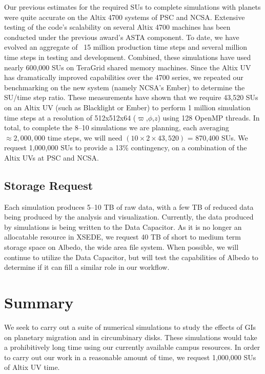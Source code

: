 \documentclass[12pt,preprint2]{aastex}
\begin{document}
Our previous estimates for the required SUs to complete simulations with planets were quite accurate on the Altix 4700
systems of PSC and NCSA. Extensive testing of the
code's scalability on several Altix 4700 machines has been conducted under the previous award's ASTA component. To date, we
have evolved an aggregate of ~15 million production time steps and several million time steps in testing and
development. Combined, these simulations have used nearly 600,000 SUs on TeraGrid shared memory machines. Since the
Altix UV has dramatically improved capabilities over the 4700 series, we repeated our benchmarking on the new system
(namely NCSA's Ember) to determine the SU/time step ratio.  These  measurements have shown that we require
43,520 SUs on an Altix UV (such as Blacklight or Ember) to perform 1 million simulation time steps at a
resolution of 512x512x64 ($\varpi$,$\phi$,$z$) using 128 OpenMP threads. In total, to complete the 8--10
simulations we are planning, each averaging $\approx 2,000,000$ time steps, we will need $(10\times2\times43,520)$ =
870,400 SUs. We request 1,000,000 SUs to provide a 13\% contingency, on a combination of the Altix UVs at PSC and NCSA.

\subsection{Storage Request}\label{sec:storage}

Each simulation produces 5--10 TB of raw data, with a few TB of reduced data being produced by the analysis and
visualization. Currently, the data produced by simulations is being written to the Data Capacitor. As it is no longer an
allocatable resource in XSEDE, we request 40 TB of short to medium term storage space on Albedo, the wide area file
system. When possible, we will continue to utilize the Data Capacitor, but will test the capabilities of Albedo to
determine if it can fill a similar role in our workflow. 

\section{Summary}
\label{sec:summary} 

We seek to carry out a suite of numerical simulations to study the effects of GIs on planetary migration and in
circumbinary disks. These simulations would take a prohibitively long time using our currently available campus resources. In
order to carry out our work in a reasonable amount of time, we request 1,000,000 SUs of Altix UV time.

\scriptsize
\setlength{\baselineskip}{7.5pt}
\setlength{\bibspacing}{\baselineskip}



\end{document}
